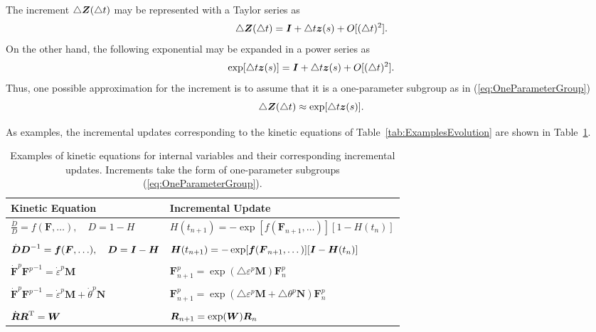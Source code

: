 \documentclass[12pt]{article}
\newcommand{\mbs}[1]{\boldsymbol{#1}}
\def\bD{{\mbs{D}}} \def\bE{{\mbs{E}}} \def\bF{{\mbs{F}}}
\def\bM{{\mbs{M}}} \def\bN{{\mbs{N}}} \def\bO{{\mbs{O}}}
\begin{document}
The increment $\triangle \bZ(\triangle t)$ may be represented with a Taylor
series as
\begin{equation}
  \triangle \bZ(\triangle t)  =
  \bI + \triangle t \bz(s) + O[(\triangle t)^2].
  \label{eq:TaylorSeries}
\end{equation}
On the other hand, the following exponential may be expanded in a
power series as
\begin{equation}
  \exp[\triangle t \bz(s)] =
  \bI + \triangle t \bz(s) + O[(\triangle t)^2].
  \label{eq:PowerSeries}
\end{equation}
Thus, one possible approximation for the increment is to assume
that it is a one-parameter subgroup as in (\ref{eq:OneParameterGroup})
\begin{equation}
  \triangle \bZ(\triangle t) \approx
  \exp[\triangle t \bz(s)].
  \label{eq:Increment}
\end{equation}

As examples, the incremental updates corresponding to the kinetic
equations of Table~\ref{tab:ExamplesEvolution} are shown in
Table~\ref{tab:ExamplesIncrements}.

\begin{table}[htbp]
  \begin{center}
    \begin{tabular}{ l l }
      \toprule
      Kinetic Equation
      &
      Incremental Update
      \\
      \hline
      $\displaystyle\frac{\dot{D}}{D} =
        f(\bF,\ldots),\quad D = 1 - H$
      &
      $H(t_{n+1}) = - \exp[f(\bF_{n+1}, \dots)] [1 - H(t_{n})]$
      \\
      \\
      $\dot{\bD}\bD^{-1} =
      \fb(\bF,\ldots), \quad \bD = \bI - \bH$
      &
      $\bH(t_{n+1}) = - \exp[\fb(\bF_{n+1}, \dots)] [\bI - \bH(t_{n})]$
      \\
      \\
      $\dot{\bF}^p {\bF^p}^{-1} = \dot{\varepsilon}^p \bM$
      &
      $\bF^p_{n+1} = \exp(\triangle \varepsilon^p \bM) \bF^p_{n}$
      \\
      \\
      $\dot{\bF}^p {\bF^p}^{-1} = \dot{\varepsilon}^p \bM +
      \dot{\theta}^p \bN$
      &
      $\bF^p_{n+1} =
      \exp(\triangle \varepsilon^p \bM + \triangle
      \theta^p \bN) \bF^p_{n}$
      \\
      \\
      $\dot{\bR} {\bR}^{\text{T}} = \bW$
      &
      $\bR_{n+1} = \exp(\bW) \bR_{n}$
      \\
      \bottomrule
    \end{tabular}
    \caption{Examples of kinetic equations for internal variables and
      their corresponding incremental updates. Increments take the
      form of one-parameter subgroups (\ref{eq:OneParameterGroup}).}
    \label{tab:ExamplesIncrements}
  \end{center}
\end{table}
\end{document}
